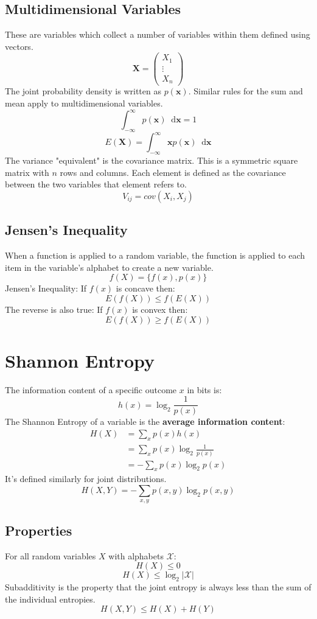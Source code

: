 \documentclass[a4paper,12pt,DIV=calc]{scrartcl}
\newcommand*{\diff}{\mathop{}\!\mathrm{d}}
\begin{document}
\subsection{Multidimensional Variables}
These are variables which collect a number of variables within them defined
using vectors.
\[\mathbf{X} = \begin{pmatrix}X_1\\\vdots\\X_n\end{pmatrix}\]
The joint probability density is written as $p(\mathbf{x})$. Similar rules for
the sum and mean apply to multidimensional variables.
\[\int_{-\infty}^{\infty} p(\mathbf{x}) \diff \mathbf{x} = 1\]
\[E(\mathbf{X}) = \int_{-\infty}^{\infty} \mathbf{x} p(\mathbf{x}) \diff \mathbf{x}\]
The variance "equivalent" is the covariance matrix. This is a symmetric square
matrix with $n$ rows and columns. Each element is defined as the covariance
between the two variables that element refers to.
\[V_{ij} = cov(X_i, X_j)\]

\subsection{Jensen's Inequality}
When a function is applied to a random variable, the function is applied to each
item in the variable's alphabet to create a new variable.
\[f(X) = \{f(x), p(x)\}\]
Jensen's Inequality: If $f(x)$ is concave then:
\[E(f(X)) \leq f(E(X))\]
The reverse is also true: If $f(x)$ is convex then:
\[E(f(X)) \geq f(E(X))\]

\section{Shannon Entropy}
The information content of a specific outcome $x$ in bits is:
\[h(x) = \log_2\frac{1}{p(x)}\]
The Shannon Entropy of a variable is the \textbf{average information content}:
\begin{align*}
  H(X) &= \sum_x p(x)h(x) \\
       &= \sum_x p(x) \log_2\frac{1}{p(x)} \\
       &= -\sum_x p(x) \log_2 p(x)
\end{align*}
It's defined similarly for joint distributions.
\[H(X, Y) = -\sum_{x,y} p(x, y) \log_2 p(x, y)\]

\subsection{Properties}
For all random variables $X$ with alphabets $\mathcal{X}$:
\[H(X) \leq 0\]
\[H(X) \leq \log_2 \vert\mathcal{X}\vert\]
Subadditivity is the property that the joint entropy is always less than the sum
of the individual entropies.
\[H(X, Y) \leq H(X) + H(Y)\]
\end{document}
